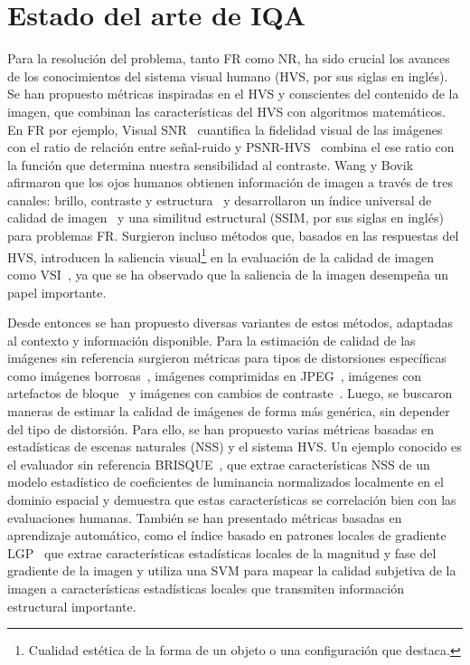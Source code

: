 \section{Estado del arte de IQA}
Para la resolución del problema, tanto FR como NR, ha sido crucial los avances de los conocimientos 
del sistema visual humano (HVS, por sus siglas en inglés). Se han propuesto métricas inspiradas en el HVS y 
conscientes del contenido de la imagen, que combinan las características del HVS 
con algoritmos matemáticos. En FR por ejemplo, Visual SNR~\cite{VSNR} cuantifica 
la fidelidad visual de las imágenes con el ratio de relación entre señal-ruido y 
PSNR-HVS~\cite{PSNR-HVS} combina el ese ratio con la función que determina 
nuestra sensibilidad al contraste. 
Wang y Bovik afirmaron que los ojos humanos obtienen información de imagen a 
través de tres canales: brillo, contraste y estructura~\cite{SSIM} y desarrollaron 
un índice universal de calidad de imagen~\cite{UQI} y una similitud 
estructural (SSIM, por sus siglas en inglés)~\cite{SSIM} para problemas FR. Surgieron incluso métodos que, basados en las 
respuestas del HVS, introducen la saliencia visual\footnote{
  Cualidad estética de la forma de un objeto o una configuración que destaca.
} en la evaluación de la calidad de imagen como VSI~\cite{VSI}, 
ya que se ha observado que la saliencia de la imagen desempeña un papel importante.

Desde entonces se han propuesto diversas variantes de estos métodos, adaptadas 
al contexto y información disponible. 
Para la estimación de calidad de las imágenes sin referencia surgieron métricas para 
tipos de distorsiones específicas como 
imágenes borrosas~\cite{GradientBasedBlurAssessment}, 
imágenes comprimidas en JPEG~\cite{JPEGBasedOnLuminance}, 
imágenes con artefactos de bloque~\cite{DeblockedImages} y imágenes con 
cambios de contraste~\cite{ContrastDistorted}.
Luego, se buscaron maneras de estimar la calidad de imágenes de forma más genérica, 
sin depender del tipo de distorsión. Para ello, se han propuesto varias métricas 
basadas en estadísticas de escenas naturales (NSS) y el sistema HVS. 
Un ejemplo conocido es el evaluador sin referencia BRISQUE~\cite{BRISQUE}, que extrae 
características NSS de un modelo estadístico de coeficientes de luminancia 
normalizados localmente en el dominio espacial y demuestra que estas características 
se correlación bien con las evaluaciones humanas.
También se han presentado métricas basadas en aprendizaje automático, 
como el índice basado en patrones locales de gradiente LGP~\cite{LGP} que extrae 
características estadísticas locales de la magnitud y fase del gradiente de la imagen y utiliza una 
SVM para mapear la calidad subjetiva de la imagen a 
características estadísticas locales que transmiten información estructural importante.

